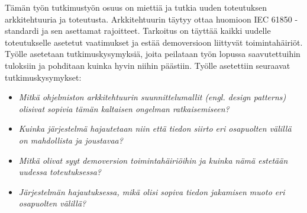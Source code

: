 Tämän työn tutkimustyön osuus on miettiä ja tutkia uuden toteutuksen arkkitehtuuria ja toteutusta. Arkkitehtuurin täytyy ottaa huomioon IEC 61850 -standardi ja sen asettamat rajoitteet. Tarkoitus on täyttää kaikki uudelle toteutukselle asetetut vaatimukset ja estää demoversioon liittyvät toimintahäiriöt. Työlle asetetaan tutkimuskysymyksiä, joita peilataan työn lopussa saavutettuihin tuloksiin ja pohditaan kuinka hyvin niihin päästiin. Työlle asetettiin seuraavat tutkimuskysymykset:
\begin{itemize}
	\item \emph{Mitkä ohjelmiston arkkitehtuurin suunnittelumallit (engl. design patterns) olisivat sopivia tämän kaltaisen ongelman ratkaisemiseen?}
	\item \emph{Kuinka järjestelmä hajautetaan niin että tiedon siirto eri osapuolten välillä on mahdollista ja joustavaa?}
	\item \emph{Mitkä olivat syyt demoversion toimintahäiriöihin ja kuinka nämä estetään uudessa toteutuksessa?}
	\item \emph{Järjestelmän hajautuksessa, mikä olisi sopiva tiedon jakamisen muoto eri osapuolten välillä?}
\end{itemize}
